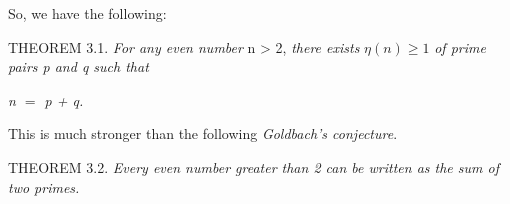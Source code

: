 \documentclass{article}
\begin{document}
So, we have the following:
\vspace{1\baselineskip}

THEOREM 3.1.  \textit{For any even number }n > 2, \textit{there exists }\( \eta\left(n\right)\geq 1\)\textit{ of prime pairs p and q such that }

\textit{n $=$ p + q.}

\vspace{1\baselineskip}

This is much stronger than the following \textit{Goldbach’s conjecture}. 

\vspace{1\baselineskip}

THEOREM 3.2.  \textit{Every even number greater than 2 can be written as the sum of two primes.}

\vspace{4\baselineskip}

\newpage
\end{document}
